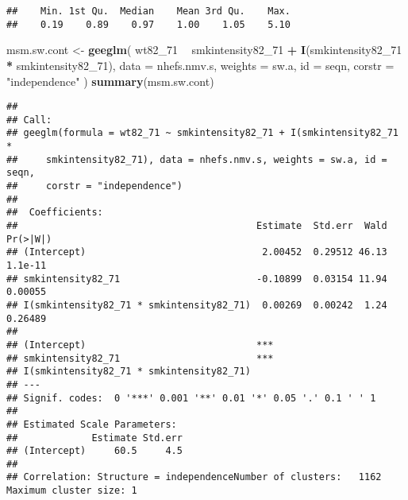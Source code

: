 \documentclass[10pt,]{book}
\newenvironment{Shaded}{\begin{snugshade}}{\end{snugshade}}
\newcommand{\CommentTok}[1]{\textcolor[rgb]{0.56,0.35,0.01}{\textit{#1}}}
\newcommand{\DataTypeTok}[1]{\textcolor[rgb]{0.13,0.29,0.53}{#1}}
\newcommand{\DecValTok}[1]{\textcolor[rgb]{0.00,0.00,0.81}{#1}}
\newcommand{\KeywordTok}[1]{\textcolor[rgb]{0.13,0.29,0.53}{\textbf{#1}}}
\newcommand{\NormalTok}[1]{#1}
\newcommand{\OperatorTok}[1]{\textcolor[rgb]{0.81,0.36,0.00}{\textbf{#1}}}
\newcommand{\StringTok}[1]{\textcolor[rgb]{0.31,0.60,0.02}{#1}}
\begin{document}
\begin{Shaded}
\end{Shaded}

\begin{verbatim}
##    Min. 1st Qu.  Median    Mean 3rd Qu.    Max. 
##    0.19    0.89    0.97    1.00    1.05    5.10
\end{verbatim}

\begin{Shaded}
\begin{Highlighting}[]
\NormalTok{msm.sw.cont <-}
\StringTok{  }\KeywordTok{geeglm}\NormalTok{(}
\NormalTok{    wt82_}\DecValTok{71} \OperatorTok{~}\StringTok{ }\NormalTok{smkintensity82_}\DecValTok{71} \OperatorTok{+}\StringTok{ }\KeywordTok{I}\NormalTok{(smkintensity82_}\DecValTok{71} \OperatorTok{*}\StringTok{ }\NormalTok{smkintensity82_}\DecValTok{71}\NormalTok{),}
    \DataTypeTok{data =}\NormalTok{ nhefs.nmv.s,}
    \DataTypeTok{weights =}\NormalTok{ sw.a,}
    \DataTypeTok{id =}\NormalTok{ seqn,}
    \DataTypeTok{corstr =} \StringTok{"independence"}
\NormalTok{  )}
\KeywordTok{summary}\NormalTok{(msm.sw.cont)}
\end{Highlighting}
\end{Shaded}

\begin{verbatim}
## 
## Call:
## geeglm(formula = wt82_71 ~ smkintensity82_71 + I(smkintensity82_71 * 
##     smkintensity82_71), data = nhefs.nmv.s, weights = sw.a, id = seqn, 
##     corstr = "independence")
## 
##  Coefficients:
##                                          Estimate  Std.err  Wald Pr(>|W|)
## (Intercept)                               2.00452  0.29512 46.13  1.1e-11
## smkintensity82_71                        -0.10899  0.03154 11.94  0.00055
## I(smkintensity82_71 * smkintensity82_71)  0.00269  0.00242  1.24  0.26489
##                                             
## (Intercept)                              ***
## smkintensity82_71                        ***
## I(smkintensity82_71 * smkintensity82_71)    
## ---
## Signif. codes:  0 '***' 0.001 '**' 0.01 '*' 0.05 '.' 0.1 ' ' 1
## 
## Estimated Scale Parameters:
##             Estimate Std.err
## (Intercept)     60.5     4.5
## 
## Correlation: Structure = independenceNumber of clusters:   1162   Maximum cluster size: 1
\end{verbatim}
\end{document}
